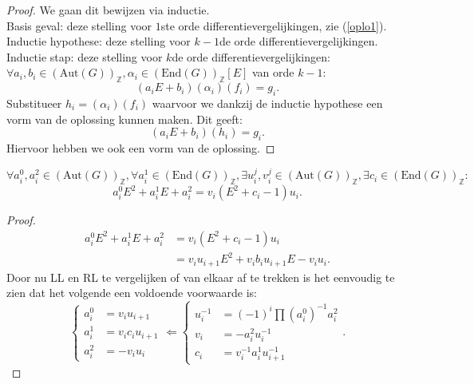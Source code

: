 \documentclass[a4paper,12pt]{article}
\begin{document}
\begin{proof}
    We gaan dit bewijzen via inductie.\\
    Basis geval: deze stelling voor $1$ste orde differentievergelijkingen, zie (\ref{oplo1}).\\
    Inductie hypothese: deze stelling voor $k-1$de orde differentievergelijkingen.\\
    Inductie stap: deze stelling voor $k$de orde differentievergelijkingen:\\
    $\forall a_i , b_i \in (\text{Aut}(G))_\mathbb{Z},\alpha_i \in (\text{End}(G))_\mathbb{Z}[E]$ van orde $k-1$:
    $$
        (a_iE+b_i)(\alpha_i)(f_i)= g_i.
    $$
    Substitueer $h_i=(\alpha_i)(f_i)$ waarvoor we dankzij de inductie hypothese een vorm van de oplossing kunnen maken. Dit geeft:
    $$
        (a_iE+b_i)(h_i)= g_i.
    $$
    Hiervoor hebben we ook een vorm van de oplossing.
\end{proof}

\begin{theorem}
    \label{gereduceerd factoriseren}
    $\forall a_i^0,a_i^2 \in (\text{Aut}(G))_{\mathbb{Z}},\forall a_i^1 \in (\text{End}(G))_{\mathbb{Z}},
        \exists u_i^j, v_i^j \in (\text{Aut}(G))_{\mathbb{Z}}, \exists c_i \in (\text{End}(G))_{\mathbb{Z}}:$
    $$
        a_{i}^{0} E^{2}+a_{i}^{1} E+a_i^{2} = v_i \left( E^2 + c_i -1 \right) u_i.
    $$
\end{theorem}

\begin{proof}
    \begin{align*}
        a_{i}^{0} E^{2}+a_{i}^{1} E+a_i^{2} & = v_i \left( E^2 + c_i -1 \right) u_i        \\
                                            & = v_iu_{i+1}E^2 + v_ib_i u_{i+1}E - v_i u_i.
    \end{align*}
    Door nu LL en RL te vergelijken of van elkaar af te trekken
    is het eenvoudig te zien dat het volgende een voldoende voorwaarde is:
    $$
        \left\{\begin{aligned}
            a_i^0 & =v_iu_{i+1}      \\
            a_i^1 & =v_i c_i u_{i+1} \\
            a_i^2 & = -v_iu_i
        \end{aligned} \right.
        \Leftarrow
        \left\{\begin{aligned}
            u_i^{-1} & = (-1)^i \prod{(a_i^0)^{-1} a_i^2} \\
            v_i      & = -a_i^2 u_i^{-1}                  \\
            c_i      & =v_i^{-1} a_i^1 u_{i+1}^{-1}
        \end{aligned} \right. .
    $$
\end{proof}
\end{document}
